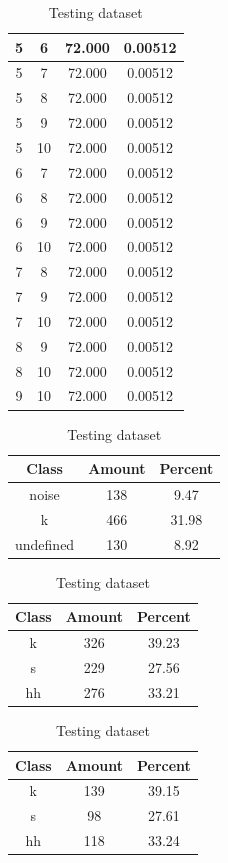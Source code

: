 \begin{table}
\begin{subtable}[h]{0.45\textwidth}
{\begin{tabular}{|c|c|c|c|}
 5 & 6 & 72.000 & 0.00512\\ \hline 
 5 & 7 & 72.000 & 0.00512\\ \hline 
 5 & 8 & 72.000 & 0.00512\\ \hline 
 5 & 9 & 72.000 & 0.00512\\ \hline 
 5 & 10 & 72.000 & 0.00512\\ \hline 
 6 & 7 & 72.000 & 0.00512\\ \hline 
 6 & 8 & 72.000 & 0.00512\\ \hline 
 6 & 9 & 72.000 & 0.00512\\ \hline 
 6 & 10 & 72.000 & 0.00512\\ \hline 
 7 & 8 & 72.000 & 0.00512\\ \hline 
 7 & 9 & 72.000 & 0.00512\\ \hline 
 7 & 10 & 72.000 & 0.00512\\ \hline 
 8 & 9 & 72.000 & 0.00512\\ \hline 
 8 & 10 & 72.000 & 0.00512\\ \hline 
 9 & 10 & 72.000 & 0.00512\\ \hline 

\end{tabular}
}\label{xlscentroid105}
\caption{xcscentroid105}
\end{subtable}

\begin{subtable}[h]{0.45\textwidth}
\centering
\begin{tabular}{|c|c|c|}
\hline
Class & Amount & Percent\\ \hline
noise & 138 & 9.47\\ \hline
k & 466 & 31.98\\ \hline
undefined & 130 & 8.92\\ \hline
\end{tabular}
\caption{Entire dataset after stripping short sounds}
\end{subtable}
\hfill
\begin{subtable}[h]{0.45\textwidth}
\centering
\begin{tabular}{|c|c|c|}
\hline
Class & Amount & Percent\\ \hline
k & 326 & 39.23\\ \hline
s & 229 & 27.56\\ \hline
hh & 276 & 33.21\\ \hline
\end{tabular}
\caption{Training dataset}
\end{subtable}
\hfill
\begin{subtable}[h]{0.45\textwidth}
\centering
\begin{tabular}{|c|c|c|}
\hline
Class & Amount & Percent\\ \hline
k & 139 & 39.15\\ \hline
s & 98 & 27.61\\ \hline
hh & 118 & 33.24\\ \hline
\end{tabular}
\caption{Testing dataset}
\end{subtable}
\hfill


\end{table}
